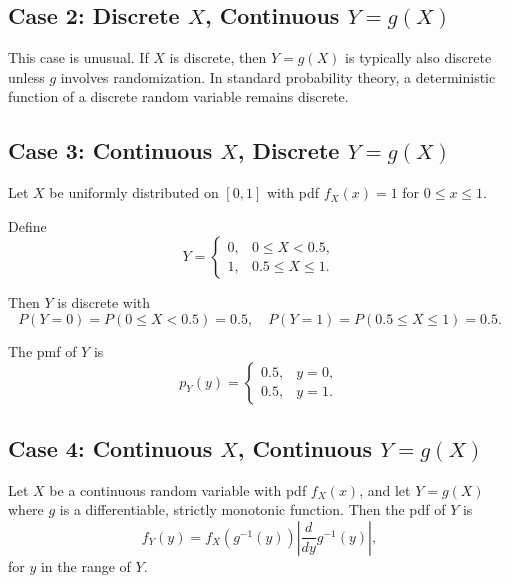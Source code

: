 \subsection{Case 2: Discrete \texorpdfstring{\(X\)}{X}, Continuous \texorpdfstring{\(Y = g(X)\)}{Y = g(X)}}

\begin{remark}
This case is unusual. If \(X\) is discrete, then \(Y = g(X)\) is typically also discrete unless \(g\) involves randomization. In standard probability theory, a deterministic function of a discrete random variable remains discrete.
\end{remark}

\subsection{Case 3: Continuous \texorpdfstring{\(X\)}{X}, Discrete \texorpdfstring{\(Y = g(X)\)}{Y = g(X)}}

\begin{eg}
Let \(X\) be uniformly distributed on \([0, 1]\) with pdf \(f_X(x) = 1\) for \(0 \le x \le 1\).

Define
\[
Y = \begin{cases}
0, & 0 \le X < 0.5, \\
1, & 0.5 \le X \le 1.
\end{cases}
\]

Then \(Y\) is discrete with
\[
P(Y = 0) = P(0 \le X < 0.5) = 0.5, \quad P(Y = 1) = P(0.5 \le X \le 1) = 0.5.
\]

The pmf of \(Y\) is
\[
p_Y(y) = \begin{cases}
0.5, & y = 0, \\
0.5, & y = 1.
\end{cases}
\]
\end{eg}

\subsection{Case 4: Continuous \texorpdfstring{\(X\)}{X}, Continuous \texorpdfstring{\(Y = g(X)\)}{Y = g(X)}}

\begin{theorem}
Let \(X\) be a continuous random variable with pdf \(f_X(x)\), and let \(Y = g(X)\) where \(g\) is a differentiable, strictly monotonic function. Then the pdf of \(Y\) is
\[
f_Y(y) = f_X(g^{-1}(y)) \left| \frac{d}{dy} g^{-1}(y) \right|,
\]
for \(y\) in the range of \(Y\).
\end{theorem}

